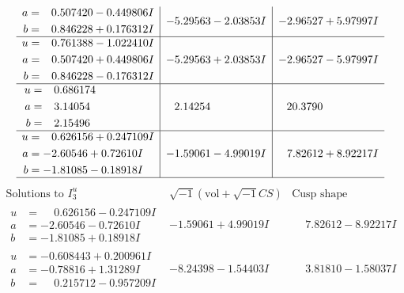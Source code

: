 \documentclass[1p]{elsarticle_modified}
\theoremstyle{definition}
\newcommand{\I}{\sqrt{-1}}
\begin{document}
$$\begin{array}{c|c|c}
\begin{aligned}
a &= \phantom{-}0.507420 - 0.449806 I \\
b &= \phantom{-}0.846228 + 0.176312 I\end{aligned}
 & -5.29563 - 2.03853 I & -2.96527 + 5.97997 I \\ \hline\begin{aligned}
u &= \phantom{-}0.761388 - 1.022410 I \\
a &= \phantom{-}0.507420 + 0.449806 I \\
b &= \phantom{-}0.846228 - 0.176312 I\end{aligned}
 & -5.29563 + 2.03853 I & -2.96527 - 5.97997 I \\ \hline\begin{aligned}
u &= \phantom{-}0.686174\phantom{ +0.000000I} \\
a &= \phantom{-}3.14054\phantom{ +0.000000I} \\
b &= \phantom{-}2.15496\phantom{ +0.000000I}\end{aligned}
 & \phantom{-}2.14254\phantom{ +0.000000I} & \phantom{-}20.3790\phantom{ +0.000000I} \\ \hline\begin{aligned}
u &= \phantom{-}0.626156 + 0.247109 I \\
a &= -2.60546 + 0.72610 I \\
b &= -1.81085 - 0.18918 I\end{aligned}
 & -1.59061 - 4.99019 I & \phantom{-}7.82612 + 8.92217 I\\
 \hline 
 \end{array}$$\newpage$$\begin{array}{c|c|c}  
\text{Solutions to }I^u_{3}& \I (\text{vol} + \sqrt{-1}CS) & \text{Cusp shape}\\
 \hline 
\begin{aligned}
u &= \phantom{-}0.626156 - 0.247109 I \\
a &= -2.60546 - 0.72610 I \\
b &= -1.81085 + 0.18918 I\end{aligned}
 & -1.59061 + 4.99019 I & \phantom{-}7.82612 - 8.92217 I \\ \hline\begin{aligned}
u &= -0.608443 + 0.200961 I \\
a &= -0.78816 + 1.31289 I \\
b &= \phantom{-}0.215712 - 0.957209 I\end{aligned}
 & -8.24398 - 1.54403 I & \phantom{-}3.81810 - 1.58037 I \\ \hline\begin{aligned}

\end{aligned}
\end{array}$$
\end{document}
